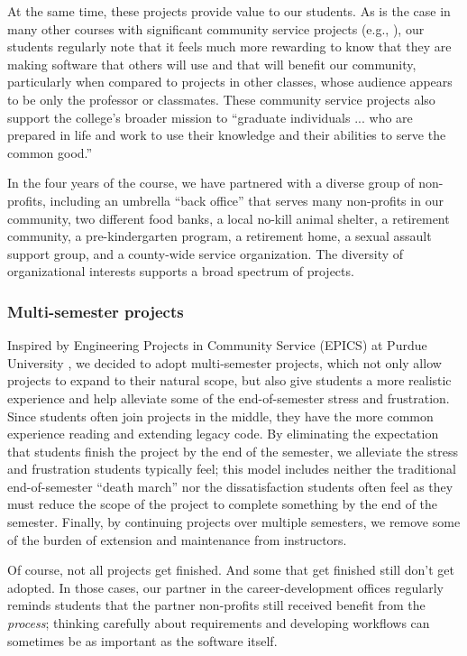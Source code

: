 At the same time, these projects provide value to our students.  As
is the case in many other courses with significant community service
projects (e.g., \cite{coyle-2005, hfoss-2018}), our students
regularly note that it feels much more rewarding to know that they are
making software that others will use and that will benefit our community,
particularly when compared to projects in other classes, whose audience
appears to be only the professor or classmates.
These community service projects also support
the college's broader mission to ``graduate individuals ... who are
prepared in life and work to use their knowledge and their abilities
to serve the common good.'' \cite{grinnell-mission}

In the four years of the course, we have partnered with a diverse
group of non-profits, including an umbrella ``back office'' that
serves many non-profits in our community, two different food banks,
a local no-kill animal shelter, a retirement community, a
pre-kindergarten program, a retirement home, a sexual assault support
group, and a county-wide service organization.  The diversity of
organizational interests supports a broad spectrum of projects.

\subsubsection{Multi-semester projects}

Inspired by Engineering Projects in Community Service (EPICS) at
Purdue University \cite{coyle-2005}, we decided to adopt multi-semester
projects, which not only allow projects to expand to their natural
scope, but also give students a more realistic experience and help
alleviate some of the end-of-semester stress and frustration.  Since
students often join projects in the middle, they have the more common
experience reading and extending legacy code.  By eliminating the
expectation that students finish the project by the end of the
semester, we alleviate the stress and frustration students typically
feel; this model includes neither the traditional end-of-semester
``death march'' nor the dissatisfaction students often feel as they
must reduce the scope of the project to complete something by the
end of the semester.  Finally, by continuing projects over multiple
semesters, we remove some of the burden of extension and maintenance
from instructors.

Of course, not all projects get finished.  And some that get finished
still don't get adopted.  In those cases, our partner in the 
career-development offices regularly reminds students that the
partner non-profits still received benefit from the \textit{process};
thinking carefully about requirements and developing workflows can
sometimes be as important as the software itself.

